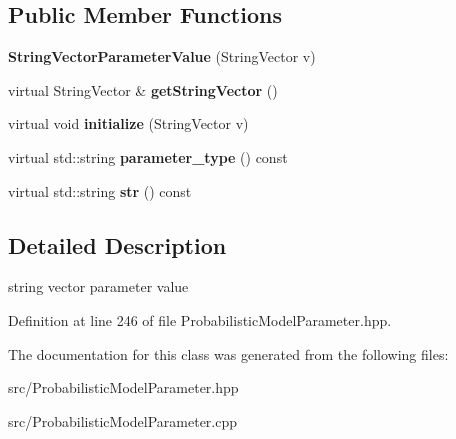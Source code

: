 \subsection*{Public Member Functions}
\begin{DoxyCompactItemize}
\item 
\mbox{\label{classtops_1_1StringVectorParameterValue_a3a958ef07442dd02e1bcf30056a2f830}} 
{\bfseries String\+Vector\+Parameter\+Value} (String\+Vector v)
\item 
\mbox{\label{classtops_1_1StringVectorParameterValue_a1ea44c5c7fb8edb597864481e700a6a1}} 
virtual String\+Vector \& {\bfseries get\+String\+Vector} ()
\item 
\mbox{\label{classtops_1_1StringVectorParameterValue_a3ac543bcc1d291491d72e6e057ce741c}} 
virtual void {\bfseries initialize} (String\+Vector v)
\item 
\mbox{\label{classtops_1_1StringVectorParameterValue_a35e192c9e0ca351614a30241d66f4624}} 
virtual std\+::string {\bfseries parameter\+\_\+type} () const
\item 
\mbox{\label{classtops_1_1StringVectorParameterValue_a15ff040f0fd17c333feee752f5e93642}} 
virtual std\+::string {\bfseries str} () const
\end{DoxyCompactItemize}


\subsection{Detailed Description}
string vector parameter value 

Definition at line 246 of file Probabilistic\+Model\+Parameter.\+hpp.



The documentation for this class was generated from the following files\+:\begin{DoxyCompactItemize}
\item 
src/Probabilistic\+Model\+Parameter.\+hpp\item 
src/Probabilistic\+Model\+Parameter.\+cpp\end{DoxyCompactItemize}
